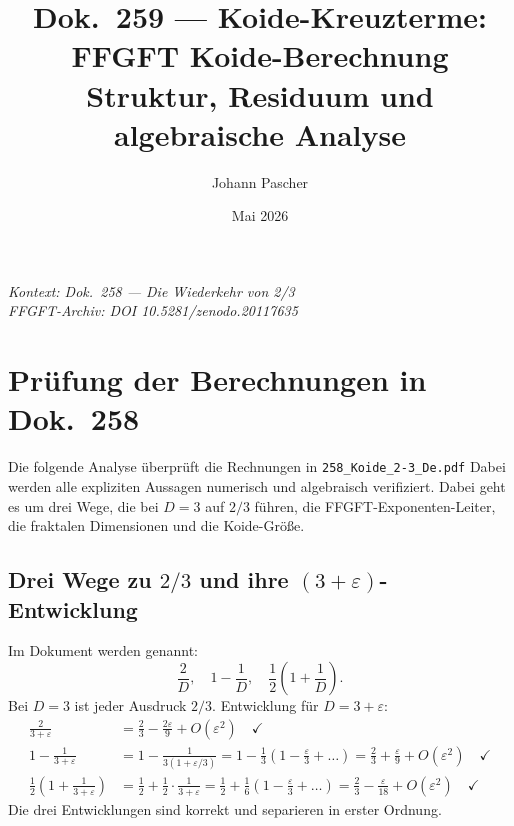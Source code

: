 
\title{Dok.~259 — Koide-Kreuzterme:\\
FFGFT Koide-Berechnung\\[0.5em]
\large Struktur, Residuum und algebraische Analyse}
\author{Johann Pascher}
\date{Mai 2026}
\maketitle

\begin{center}
\textit{Kontext: Dok.~258 — Die Wiederkehr von 2/3} \\[2pt]
\textit{FFGFT-Archiv: DOI 10.5281/zenodo.20117635}
\end{center}

\tableofcontents
\newpage

\section{Prüfung der Berechnungen in Dok.~258}

Die folgende Analyse überprüft die Rechnungen in \texttt{258\_Koide\_2-3\_De.pdf}
Dabei werden alle expliziten Aussagen numerisch und algebraisch verifiziert.
Dabei geht es um drei Wege, die bei $D=3$ auf $2/3$ führen,
die FFGFT-Exponenten-Leiter, die fraktalen Dimensionen und die Koide-Größe.

\subsection{Drei Wege zu $2/3$ und ihre $(3+\varepsilon)$-Entwicklung}

Im Dokument werden genannt:
\[
  \frac{2}{D}, \quad 1-\frac{1}{D}, \quad
  \frac{1}{2}\!\left(1+\frac{1}{D}\right).
\]
Bei $D=3$ ist jeder Ausdruck $2/3$.
Entwicklung für $D=3+\varepsilon$:
\begin{align*}
\frac{2}{3+\varepsilon} &= \frac{2}{3}-\frac{2\varepsilon}{9}+O(\varepsilon^2) \quad\checkmark \\[4pt]
1-\frac{1}{3+\varepsilon} &= 1-\frac{1}{3(1+\varepsilon/3)}
  = 1-\tfrac{1}{3}(1-\tfrac{\varepsilon}{3}+\ldots)
  = \frac{2}{3}+\frac{\varepsilon}{9}+O(\varepsilon^2) \quad\checkmark \\[4pt]
\frac{1}{2}\!\left(1+\frac{1}{3+\varepsilon}\right)
  &= \frac{1}{2}+\frac{1}{2}\cdot\frac{1}{3+\varepsilon}
  = \frac{1}{2}+\frac{1}{6}(1-\tfrac{\varepsilon}{3}+\ldots)
  = \frac{2}{3}-\frac{\varepsilon}{18}+O(\varepsilon^2) \quad\checkmark
\end{align*}
Die drei Entwicklungen sind korrekt und separieren in erster Ordnung.

